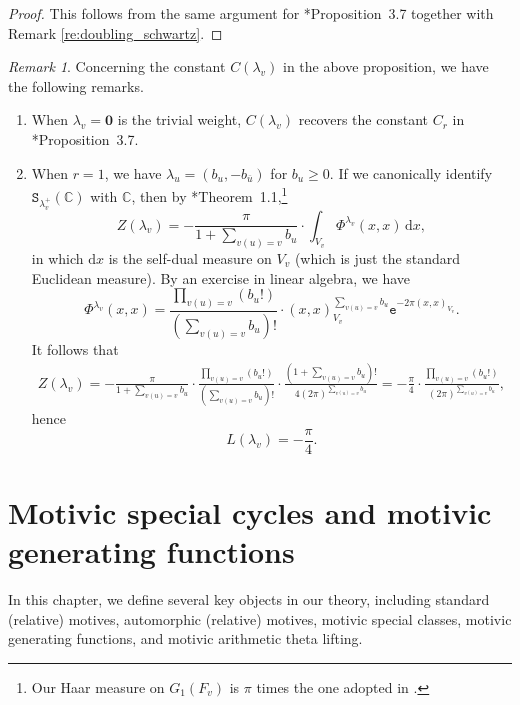 \documentclass[12pt]{amsart}
\numberwithin{equation}{section}
\theoremstyle{plain}
\theoremstyle{definition}
\theoremstyle{remark}
\newtheorem{remark}[proposition]{Remark}
\renewcommand{\b}[1]{\mathbf{#1}}
\renewcommand{\d}[1]{\mathbb{#1}}
\renewcommand{\r}[1]{\mathrm{#1}}
\renewcommand{\(}{\left(}
\renewcommand{\)}{\right)}
\newcommand{\ol}[1]{\overline{#1}{}}
\renewcommand{\geq}{\geqslant}
\newcommand{\dC}{\d C}
\newcommand{\rd}{\,\r d}
\newcommand{\tS}{\mathtt{S}}
\newcommand{\te}{\mathtt{e}}
\begin{document}
\begin{proof}
This follows from the same argument for \cite{LL21}*{Proposition~3.7} together with Remark \ref{re:doubling_schwartz}.
\end{proof}



\begin{remark}\label{re:constant}
Concerning the constant $C(\lambda_v)$ in the above proposition, we have the following remarks.
\begin{enumerate}
  \item When $\lambda_v=\b{0}$ is the trivial weight, $C(\lambda_v)$ recovers the constant $C_r$ in \cite{LL21}*{Proposition~3.7}.

  \item When $r=1$, we have $\lambda_u=(b_u,-b_{\ol{u}})$ for $b_u\geq 0$. If we canonically identify $\tS_{\lambda_v^+}(\dC)$ with $\dC$, then by \cite{Lin}*{Theorem~1.1},\footnote{Our Haar measure on $G_1(F_v)$ is $\pi$ times the one adopted in \cite{Lin}.}
      \[
      Z(\lambda_v)=-\frac{\pi}{1+\sum_{v(u)=v}b_u}\cdot\int_{V_v}\Phi^{\lambda_v}(x,x)\rd x,
      \]
      in which $\r{d}x$ is the self-dual measure on $V_v$ (which is just the standard Euclidean measure). By an exercise in linear algebra, we have
      \[
      \Phi^{\lambda_v}(x,x)=\frac{\prod_{v(u)=v}(b_u!)}{(\sum_{v(u)=v}b_u)!}\cdot (x,x)_{V_v}^{\sum_{v(u)=v}b_u}\te^{-2\pi(x,x)_{V_v}}.
      \]
      It follows that
      \begin{align*}
      Z(\lambda_v)=-\frac{\pi}{1+\sum_{v(u)=v}b_u}
      \cdot\frac{\prod_{v(u)=v}(b_u!)}{(\sum_{v(u)=v}b_u)!}\cdot\frac{(1+\sum_{v(u)=v}b_u)!}{4(2\pi)^{\sum_{v(u)=v}b_u}}
      =-\frac{\pi}{4}\cdot\frac{\prod_{v(u)=v}(b_u!)}{(2\pi)^{\sum_{v(u)=v}b_u}},
      \end{align*}
      hence
      \[
      L(\lambda_v)=-\frac{\pi}{4}.
      \]
\end{enumerate}
\end{remark}




\section{Motivic special cycles and motivic generating functions}
\label{ss:3}

In this chapter, we define several key objects in our theory, including standard (relative) motives, automorphic (relative) motives, motivic special classes, motivic generating functions, and motivic arithmetic theta lifting.
\end{document}
